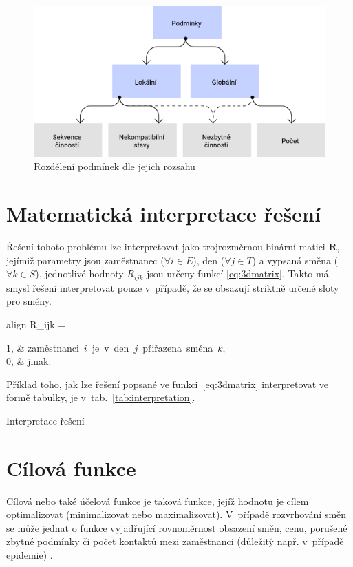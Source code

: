 \documentclass[twoside]{ctuthesis}
\newcommand{\coloredeq}[2]{\begin{empheq}[box=\colorbox{Gray}]{align}\label{#1}\hspace{1em}#2\hspace{1em}\end{empheq}}
\begin{document}
\begin{figure}[h]
	\includegraphics[scale=0.7]{img/constraints.pdf}
	\caption{Rozdělení podmínek dle jejich rozsahu}
	\label{fig:constraints}
\end{figure}

\section{Matematická interpretace řešení}
Řešení tohoto problému lze interpretovat jako trojrozměrnou binární matici $\boldsymbol{R}$, jejímiž parametry jsou zaměstnanec ($\forall i \in E$), den ($\forall j \in T$) a vypsaná směna ($\forall k \in S$), jednotlivé hodnoty $R_{ijk}$ jsou určeny funkcí \ref{eq:3dmatrix}. \cite{vaclavik2016roster} Takto má smysl řešení interpretovat pouze v~případě, že se obsazují striktně určené sloty pro směny.

\coloredeq{eq:3dmatrix}{
	R_{ijk} =
	\begin{cases}
		1, & \mbox{zaměstnanci $i$ je v den $j$ přiřazena směna $k$,} \\
		0, & \mbox{jinak.}\\
	\end{cases}
}


Příklad toho, jak lze řešení popsané ve funkci~\ref{eq:3dmatrix} interpretovat ve formě tabulky, je v~tab.~\ref{tab:interpretation}.
\begin{table}[h]
	
	\caption{Interpretace řešení}
	\label{tab:interpretation}
\end{table}

\section{Cílová funkce}
\label{sec:objective}
Cílová nebo také účelová funkce je taková funkce, jejíž hodnotu je cílem optimalizovat (minimalizovat nebo maximalizovat). V~případě rozvrhování směn se může jednat o funkce vyjadřující rovnoměrnost obsazení směn, cenu, porušené zbytné podmínky \cite{blochliger2004modeling} či počet kontaktů mezi zaměstnanci (důležitý např. v~případě epidemie) \cite{zucchi2020personnel}.
\end{document}

